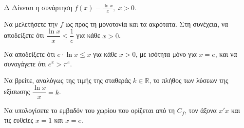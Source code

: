 \begin{thema}{Δ}
Δίνεται η συνάρτηση $\displaystyle f(x) = \frac{\ln x}{x}, \; x > 0$.
\begin{erwthma}
    \item Να μελετήσετε την $f$ ως προς τη μονοτονία και τα ακρότατα. Στη συνέχεια, να αποδείξετε ότι $\dfrac{\ln x}{x} \le \dfrac{1}{e}$ για κάθε $x > 0$.
    \item Να αποδείξετε ότι $e \cdot \ln x \le x$ για κάθε $x > 0$, με ισότητα μόνο για $x = e$, και να συναγάγετε ότι $e^\pi > \pi^e$.
    \item Να βρείτε, αναλόγως της τιμής της σταθεράς $k \in \mathbb{R}$, το πλήθος των λύσεων της εξίσωσης $\dfrac{\ln x}{x} = k$.
    \item Να υπολογίσετε το εμβαδόν του χωρίου που ορίζεται από τη $C_f$, τον άξονα $x'x$ και τις ευθείες $x = 1$ και $x = e$.
\end{erwthma}
\end{thema}
